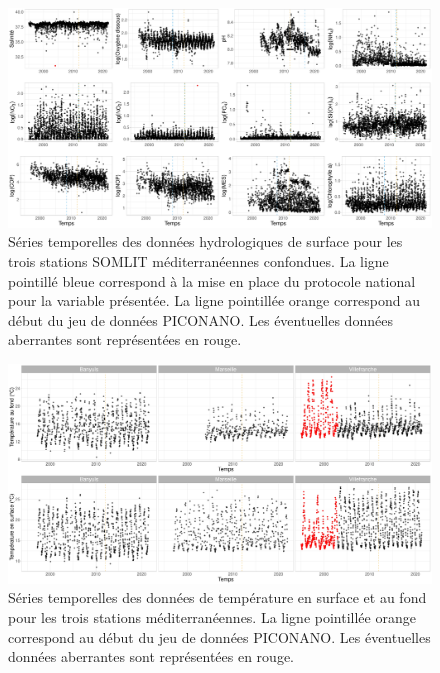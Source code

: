 \documentclass[12pt]{article}
\begin{document}
\begin{figure}
\centering
\includegraphics[width=\textwidth]{fig/MM_visualisation_hydro.pdf}
\caption{Séries temporelles des données hydrologiques de surface pour les trois stations SOMLIT méditerranéennes confondues. La ligne pointillé bleue correspond à la mise en place du protocole national pour la variable présentée. La ligne pointillée orange correspond au début du jeu de données PICONANO. Les éventuelles données aberrantes sont représentées en rouge.}
\label{vis_hydro}
\end{figure}

\begin{figure}
\centering
\includegraphics[width=.9\textwidth]{fig/MM_visualisation_T.pdf}
\caption{Séries temporelles des données de température en surface et au fond pour les trois stations méditerranéennes. La ligne pointillée orange correspond au début du jeu de données PICONANO. Les éventuelles données aberrantes sont représentées en rouge.}
\label{vis_T}
\end{figure}
\end{document}
